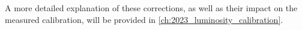 A more detailed explanation of these corrections, as well as their impact on the measured calibration, will be provided in \autoref{ch:2023_luminosity_calibration}.








